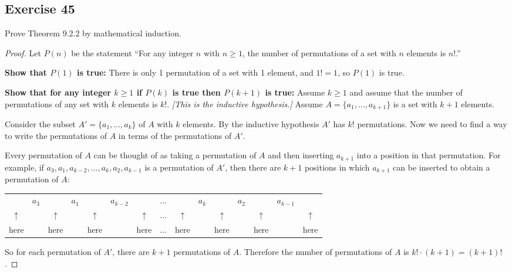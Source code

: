 \documentclass[14pt]{extarticle}
\begin{document}
\subsection{Exercise 45}
Prove Theorem 9.2.2 by mathematical induction.

\begin{proof}
     Let \(P(n)\) be the statement ``For any integer $n$ with \(n \geq 1\), the number of permutations of a set with $n$
     elements is \(n!\).''

     {\bf Show that \(P(1)\) is true:} There is only 1 permutation of a set with 1 element, and \(1! = 1\), so
     \(P(1)\) is true.

          {\bf Show that for any integer \(k \geq 1\) if \(P(k)\) is true then \(P(k+1)\) is true:} Assume \(k \geq 1\) and
     assume that the number of permutations of any set with $k$ elements is $k!$. {\it [This is the inductive hypothesis.]}
     Assume \(A = \{a_1, \ldots, a_{k+1}\}\) is a set with $k+1$ elements.

     Consider the subset \(A' = \{a_1, \ldots, a_k\}\) of $A$ with $k$ elements. By the inductive hypothesis $A'$ has
     $k!$ permutations. Now we need to find a way to write the permutations of $A$ in terms of the permutations of $A'$.

     Every permutation of $A$ can be thought of as taking a permutation of $A$ and then inserting \(a_{k+1}\) into a
     position in that permutation. For example, if \(a_3, a_1, a_{k-2}, \ldots, a_k, a_2, a_{k-1}\) is a permutation of
     $A'$, then there are $k+1$ positions in which \(a_{k+1}\) can be inserted to obtain a permutation of $A$:
     \begin{center}
          \begin{tabular}{ccccccccccccccc}
                            & \(a_3\) &              & \(a_1\) &              & \(a_{k-2}\) &              & \(\ldots\) &              & \(a_k\) &              & \(a_2\) &              & \(a_{k-1}\) &              \\
               \(\uparrow\) &         & \(\uparrow\) &         & \(\uparrow\) &             & \(\uparrow\) & \(\ldots\) & \(\uparrow\) &         & \(\uparrow\) &         & \(\uparrow\) &             & \(\uparrow\) \\
               here         &         & here         &         & here         &             & here         & \(\ldots\) & here         &         & here         &         & here         &             & here         \\
          \end{tabular}
     \end{center}
     So for each permutation of $A'$, there are $k+1$ permutations of $A$. Therefore the number of permutations
     of $A$ is \(k! \cdot (k+1) = (k+1)!\).
\end{proof}
\end{document}
